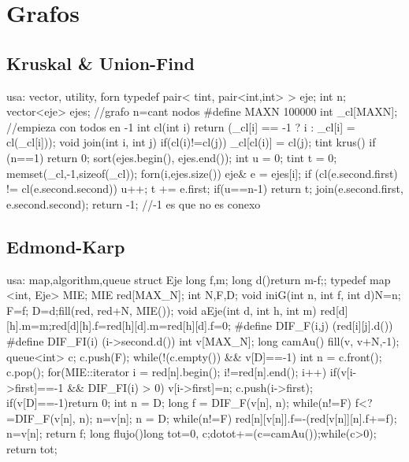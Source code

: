\documentclass[10pt,landscape,twocolumn,a4paper,notitlepage]{article}
\begin{document}
\section{Grafos}%
\subsection{Kruskal \& Union-Find}
\begin{code}
usa: vector, utility, forn
typedef pair< tint, pair<int,int> > eje;
int n; vector<eje> ejes; //grafo n=cant nodos
#define MAXN 100000
int _cl[MAXN]; //empieza con todos en -1
int cl(int i) { return (_cl[i] == -1 ? i : _cl[i] = cl(_cl[i])); }
void join(int i, int j) { if(cl(i)!=cl(j)) _cl[cl(i)] = cl(j); }
tint krus() {
  if (n==1) return 0;
  sort(ejes.begin(), ejes.end());
  int u = 0; tint t = 0;
  memset(_cl,-1,sizeof(_cl));
  forn(i,ejes.size()) {
    eje& e = ejes[i];
    if (cl(e.second.first) != cl(e.second.second)) {
      u++; t += e.first; if(u==n-1) return t;
      join(e.second.first, e.second.second);
    }
  } return -1; //-1 es que no es conexo
}
\end{code}
\subsection{Edmond-Karp}\begin{code}
usa: map,algorithm,queue
struct Eje{ long f,m; long d(){return m-f;}};
typedef map <int, Eje> MIE; MIE red[MAX_N];
int N,F,D;
void iniG(int n, int f, int d){N=n; F=f; D=d;fill(red, red+N, MIE());}
void aEje(int d, int h, int m){
  red[d][h].m=m;red[d][h].f=red[h][d].m=red[h][d].f=0;
}
#define DIF_F(i,j) (red[i][j].d())
#define DIF_FI(i)  (i->second.d())
int v[MAX_N];
long camAu(){
  fill(v, v+N,-1);
  queue<int> c;
  c.push(F);
  while(!(c.empty()) && v[D]==-1){
    int n = c.front(); c.pop();
    for(MIE::iterator i = red[n].begin(); i!=red[n].end(); i++){
      if(v[i->first]==-1 && DIF_FI(i) > 0){
        v[i->first]=n;
        c.push(i->first);
      }
    }
  }
  if(v[D]==-1)return 0;
  int n = D;
  long f = DIF_F(v[n], n);
  while(n!=F){
    f<?=DIF_F(v[n], n);
    n=v[n];
  }
  n = D;
  while(n!=F){
    red[n][v[n]].f=-(red[v[n]][n].f+=f);
    n=v[n];
  }
  return f;
}
long flujo(){long tot=0, c;do{tot+=(c=camAu());}while(c>0); return tot;}
\end{code}
\end{document}
